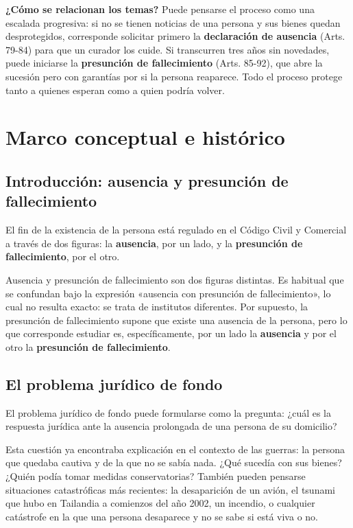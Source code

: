 \documentclass[12pt,oneside]{book}
\begin{document}
\textbf{¿Cómo se relacionan los temas?} Puede pensarse el proceso como una
escalada progresiva: si no se tienen noticias de una persona y sus bienes
quedan desprotegidos, corresponde solicitar primero la \textbf{declaración
de ausencia} (Arts. 79-84) para que un curador los cuide. Si transcurren
tres años sin novedades, puede iniciarse la \textbf{presunción de
fallecimiento} (Arts. 85-92), que abre la sucesión pero con garantías por
si la persona reaparece. Todo el proceso protege tanto a quienes esperan
como a quien podría volver.

\chapter{Marco conceptual e histórico}

\section{Introducción: ausencia y presunción de fallecimiento}

El fin de la existencia de la persona está regulado en el Código Civil y
Comercial a través de dos figuras: la \textbf{ausencia}, por un lado, y la
\textbf{presunción de fallecimiento}, por el otro.

Ausencia y presunción de fallecimiento son dos figuras distintas. Es
habitual que se confundan bajo la expresión «ausencia con presunción de
fallecimiento», lo cual no resulta exacto: se trata de institutos
diferentes. Por supuesto, la presunción de fallecimiento supone que existe
una ausencia de la persona, pero lo que corresponde estudiar es,
específicamente, por un lado la \textbf{ausencia} y por el otro la
\textbf{presunción de fallecimiento}.

\section{El problema jurídico de fondo}

El problema jurídico de fondo puede formularse como la pregunta: ¿cuál es
la respuesta jurídica ante la ausencia prolongada de una persona de su
domicilio?

Esta cuestión ya encontraba explicación en el contexto de las guerras: la
persona que quedaba cautiva y de la que no se sabía nada. ¿Qué sucedía con
sus bienes? ¿Quién podía tomar medidas conservatorias? También pueden
pensarse situaciones catastróficas más recientes: la desaparición de un
avión, el tsunami que hubo en Tailandia a comienzos del año 2002, un
incendio, o cualquier catástrofe en la que una persona desaparece y no se
sabe si está viva o no.
\end{document}
